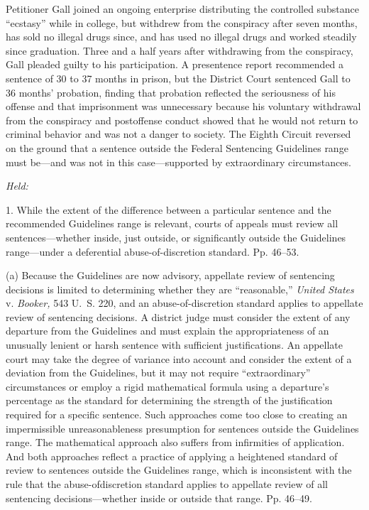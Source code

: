 
\setcounter{page}{38}

  Petitioner Gall joined an ongoing enterprise distributing the
controlled substance ``ecstasy'' while in college, but withdrew from
the conspiracy after seven months, has sold no illegal drugs since, and
has used no illegal drugs and worked steadily since graduation. Three
and a half years after withdrawing from the conspiracy, Gall pleaded
guilty to his participation. A presentence report recommended a sentence
of 30 to 37 months in prison, but the District Court sentenced Gall to
36 months' probation, finding that probation reflected the seriousness
of his offense and that imprisonment was unnecessary because his
voluntary withdrawal from the conspiracy and postoffense conduct showed
that he would not return to criminal behavior and was not a danger to
society. The Eighth Circuit reversed on the ground that a sentence
outside the Federal Sentencing Guidelines range must be---and was not in
this case---supported by extraordinary circumstances.

\emph{Held:}

  1. While the extent of the difference between a particular sentence
and the recommended Guidelines range is relevant, courts of appeals must
review all sentences---whether inside, just outside, or significantly
outside the Guidelines range---under a deferential abuse-of-discretion
standard. Pp. 46--53.

    (a) Because the Guidelines are now advisory, appellate review
of sentencing decisions is limited to determining whether they are
``reasonable,'' \emph{United States} v. \emph{Booker,} 543 U.~S. 220,
and an abuse-of-discretion standard applies to appellate review of
sentencing decisions. A district judge must consider the extent of any
departure from the Guidelines and must explain the appropriateness of
an unusually lenient or harsh sentence with sufficient justifications.
An appellate court may take the degree of variance into account and
consider the extent of a deviation from the Guidelines, but it may not
require ``extraordinary'' circumstances or employ a rigid mathematical
formula using a departure's percentage as the standard for determining
the strength of the justification required for a specific sentence. Such
approaches come too close to creating an impermissible unreasonableness
presumption for sentences outside the Guidelines range. The mathematical
approach also suffers \newpage  from infirmities of application. And both
approaches reflect a practice of applying a heightened standard of
review to sentences outside the Guidelines range, which is inconsistent
with the rule that the abuse-ofdiscretion standard applies to appellate
review of all sentencing decisions---whether inside or outside that
range. Pp. 46--49.

